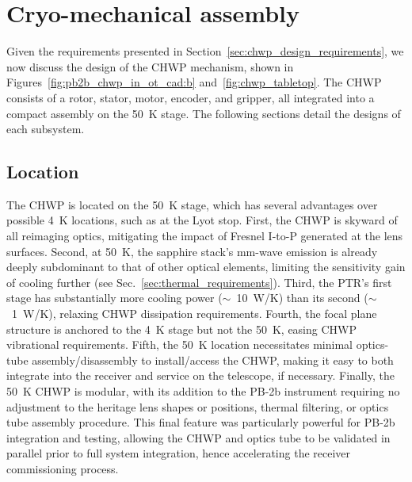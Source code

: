 
\section{Cryo-mechanical assembly}
\label{sec:chwp_design_cryo_mechanical_assembly}

Given the requirements presented in Section~\ref{sec:chwp_design_requirements}, we now discuss the design of the CHWP mechanism, shown in Figures~\ref{fig:pb2b_chwp_in_ot_cad:b} and~\ref{fig:chwp_tabletop}. The CHWP consists of a rotor, stator, motor, encoder, and gripper, all integrated into a compact assembly on the 50~K stage. The following sections detail the designs of each subsystem.


\subsection{Location}
\label{sec:location}

The CHWP is located on the 50~K stage, which has several advantages over possible 4~K locations, such as at the Lyot stop. First, the CHWP is skyward of all reimaging optics, mitigating the impact of Fresnel I-to-P generated at the lens surfaces. Second, at 50~K, the sapphire stack's mm-wave emission is already deeply subdominant to that of other optical elements, limiting the sensitivity gain of cooling further (see Sec.~\ref{sec:thermal_requirements}). Third, the PTR's first stage has substantially more cooling power ($\sim$~10~W/K) than its second ($\sim$~1~W/K), relaxing CHWP dissipation requirements. Fourth, the focal plane structure is anchored to the 4~K stage but not the 50~K, easing CHWP vibrational requirements. Fifth, the 50~K location necessitates minimal optics-tube assembly/disassembly to install/access the CHWP, making it easy to both integrate into the receiver and service on the telescope, if necessary. Finally, the 50~K CHWP is modular, with its addition to the PB-2b instrument requiring no adjustment to the heritage lens shapes or positions, thermal filtering, or optics tube assembly procedure. This final feature was particularly powerful for PB-2b integration and testing, allowing the CHWP and optics tube to be validated in parallel prior to full system integration, hence accelerating the receiver commissioning process.

